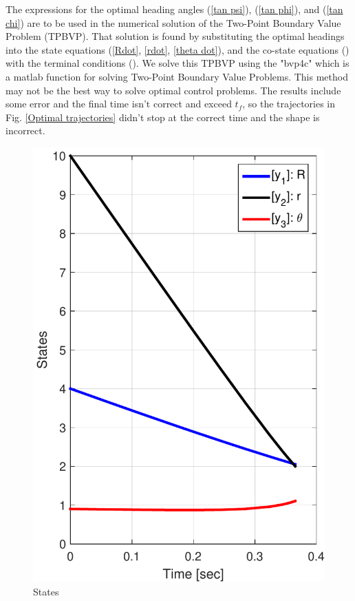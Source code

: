 The expressions for the optimal heading angles (\ref{tan psi}), (\ref{tan phi}), and (\ref{tan chi}) are to be used in the numerical solution of the Two-Point Boundary Value Problem (TPBVP). That solution is found by substituting the optimal headings into the state equations (\ref{Rdot}, \ref{rdot}, \ref{theta dot}), and the co-state equations ()  with the terminal conditions (). We solve this TPBVP using the "bvp4c" which is a matlab function for solving Two-Point Boundary Value Problems. This method may not be the best way to solve optimal control problems. The results include some error and the final time isn't correct and exceed $t_f$, so the trajectories in Fig. \ref{Optimal trajectories} didn't stop at the correct time and the shape is incorrect.



\begin{figure}[H]
	\centering
	\includegraphics[scale = 0.5]{fig/fig7a_paper.pdf}
	\caption{States}
\end{figure}


